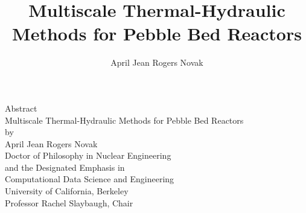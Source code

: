 \documentclass{ucbthesis}
\begin{document}
\title{Multiscale Thermal-Hydraulic Methods for Pebble Bed Reactors}
\author{April Jean Rogers Novak}


\maketitle
\approvalpage
\copyrightpage

\begin{centering}
Abstract\\
\vspace{1em}
Multiscale Thermal-Hydraulic Methods for Pebble Bed Reactors\\
\vspace{1em}
by\\
\vspace{1em}
April Jean Rogers Novak\\
\vspace{1em}
Doctor of Philosophy in Nuclear Engineering\\
\vspace{1em}
and the Designated Emphasis in\\
\vspace{1em}
Computational Data Science and Engineering\\
\vspace{1em}
University of California, Berkeley\\
\vspace{1em}
Professor Rachel Slaybaugh, Chair\\
\end{centering}
\vspace{2em}
\end{document}
